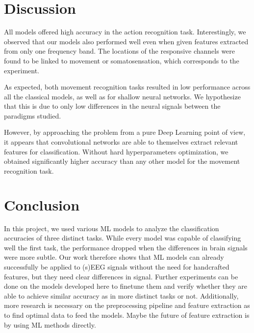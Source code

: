 \documentclass[10pt,conference,compsocconf]{IEEEtran}
\begin{document}
\section{Discussion}
\label{sec:discussion}
All models offered high accuracy in the action recognition task. Interestingly, we observed that our models also performed well even when given features extracted from only one frequency band. The locations of the responsive channels were found to be linked to movement or somatosensation, which corresponds to the experiment.

As expected, both movement recognition tasks resulted in low performance across all the classical models, as well as for shallow neural networks. We hypothesize that this is due to only low differences in the neural signals between the paradigms studied.

However, by approaching the problem from a pure Deep Learning point of view, it appears that convolutional networks are able to themselves extract relevant features for classification. Without hard hyperparameters optimization, we obtained significantly higher accuracy than any other model for the movement recognition task.

\section{Conclusion}
\label{sec:conclusion}
In this project, we used various ML models to analyze the classification accuracies of three distinct tasks. While every model was capable of classifying well the first task, the performance dropped when the differences in brain signals were more subtle. Our work therefore shows that ML models can already successfully be applied to (s)EEG signals without the need for handcrafted features, but they need clear differences in signal. Further experiments can be done on the models developed here to finetune them and verify whether they are able to achieve similar accuracy as in more distinct tasks or not. Additionally, more research is necessary on the preprocessing pipeline and feature extraction as to find optimal data to feed the models. Maybe the future of feature extraction is by using ML methods directly.

\newpage
\end{document}

